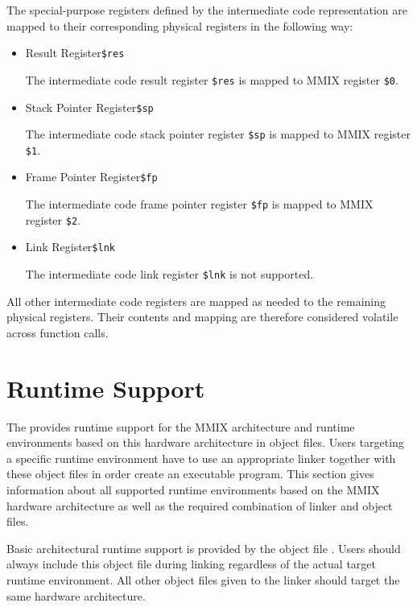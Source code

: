The special-purpose registers defined by the intermediate code representation are mapped to their corresponding physical registers in the following way:

\begin{itemize}

\item Result Register\alignright\texttt{\$res}\nopagebreak

The intermediate code result register \texttt{\$res} is mapped to MMIX register \texttt{\$0}.

\item Stack Pointer Register\alignright\texttt{\$sp}\nopagebreak

The intermediate code stack pointer register \texttt{\$sp} is mapped to MMIX register \texttt{\$1}.

\item Frame Pointer Register\alignright\texttt{\$fp}\nopagebreak

The intermediate code frame pointer register \texttt{\$fp} is mapped to MMIX register \texttt{\$2}.

\item Link Register\alignright\texttt{\$lnk}\nopagebreak

The intermediate code link register \texttt{\$lnk} is not supported.

\end{itemize}

All other intermediate code registers are mapped as needed to the remaining physical registers.
Their contents and mapping are therefore considered volatile across function calls.

\section{Runtime Support}

The \ecs{} provides runtime support for the MMIX architecture and runtime environments based on this hardware architecture in object files.
Users targeting a specific runtime environment have to use an appropriate linker together with these object files in order create an executable program.
This section gives information about all supported runtime environments based on the MMIX hardware architecture as well as the required combination of linker and object files.

Basic architectural runtime support is provided by the object file .
Users should always include this object file during linking regardless of the actual target runtime environment.
All other object files given to the linker should target the same hardware architecture.

